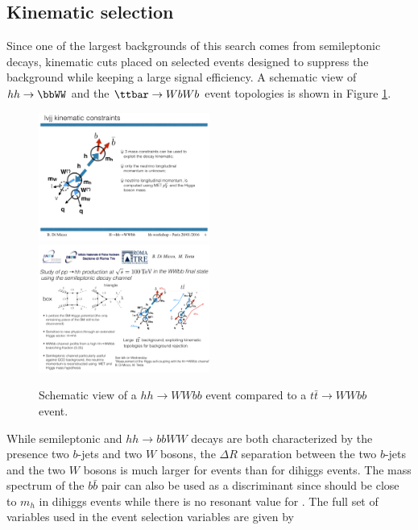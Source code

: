 \subsection{Kinematic selection}
\label{subsec:kincuts}
Since one of the largest backgrounds of this search comes from semileptonic \ttbar decays, kinematic cuts placed on selected events designed to suppress the \ttbar background while keeping a large signal efficiency.  A schematic view of $hh \to \bbWW$ and the $\ttbar \to WbWb$ event topologies is shown in Figure \ref{fig:cartoon}.
\begin{figure}
\includegraphics[width=0.5\textwidth]{chapters/dihiggs2/figures/cartoon_hh.pdf}
\includegraphics[width=0.5\textwidth]{chapters/dihiggs2/figures/cartoon_tt.pdf}
\caption{Schematic view of a $hh \to WWbb$ event compared to a $t\bar{t} \to WWbb$ event.} 
\label{fig:cartoon}
\end{figure}
While semileptonic \ttbar and $hh\rightarrow bbWW$ decays are both characterized by the presence two $b$-jets and two $W$ bosons, the $\Delta R$ separation between the two $b$-jets and the two $W$ bosons is much larger for \ttbar events than for dihiggs events. The mass spectrum of the $b\bar{b}$ pair can also be used as a discriminant since \mbb should be close to $m_h$ in dihiggs events while there is no resonant value for \ttbar. The full set of variables used in the event selection variables are given by
